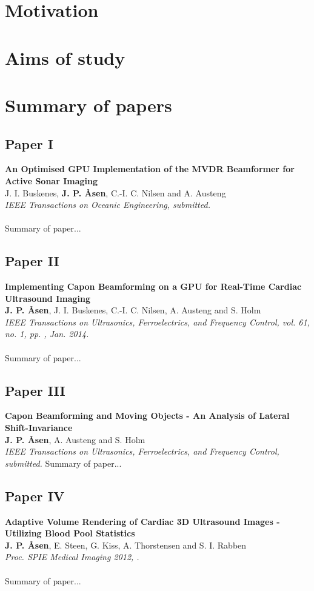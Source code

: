\section{Motivation}

\section{Aims of study}

\section{Summary of papers}

\subsection{Paper I}
\textbf{An Optimised GPU Implementation of the MVDR Beamformer for Active Sonar Imaging}\\
J. I. Buskenes, \textbf{J. P. \AA{}sen}, C.-I. C. Nilsen and A. Austeng\\
{\it IEEE Transactions on Oceanic Engineering, submitted.}\\\\
Summary of paper...

\subsection{Paper II}
\textbf{Implementing Capon Beamforming on a GPU for Real-Time Cardiac Ultrasound Imaging}\\
\textbf{J. P. \AA{}sen}, J. I. Buskenes, C.-I. C. Nilsen, A. Austeng and S. Holm\\
{\it IEEE Transactions on Ultrasonics, Ferroelectrics, and Frequency Control, vol. 61, no. 1, pp. , Jan. 2014.}\\\\
Summary of paper...

\subsection{Paper III}
\textbf{Capon Beamforming and Moving Objects - An Analysis of Lateral Shift-Invariance}\\
\textbf{J. P. \AA{}sen}, A. Austeng and S. Holm\\
{\it IEEE Transactions on Ultrasonics, Ferroelectrics, and Frequency Control, submitted.}
Summary of paper...

\subsection{Paper IV}
\textbf{Adaptive Volume Rendering of Cardiac 3D Ultrasound Images - Utilizing Blood Pool Statistics}\\
\textbf{J. P. \AA{}sen}, E. Steen, G. Kiss, A. Thorstensen and S. I. Rabben\\
{\it Proc. SPIE Medical Imaging 2012, .}\\\\
Summary of paper...

